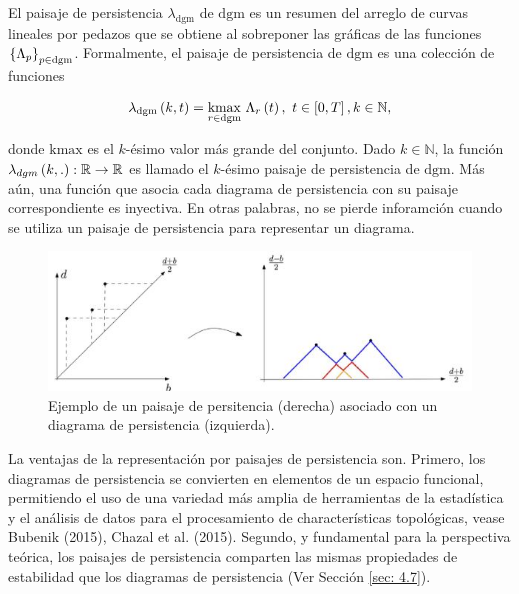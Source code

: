 El paisaje de persistencia $\lambda_{\mathrm{dgm}}$ de $\mathrm{dgm}$ es un resumen
del arreglo de curvas lineales por pedazos que se obtiene al sobreponer las gr\'aficas
de las funciones $\left\{\Lambda_{p}\right\}_{p\in\mathrm{dgm}}$.
Formalmente, el paisaje de persistencia de $\mathrm{dgm}$ es una colecci\'on de funciones

\begin{equation*}
    \lambda_{\mathrm{dgm}}\left(k,t\right) =
    \underset{r\in\mathrm{dgm}}{\mathrm{kmax}}\text{ }\Lambda_{r}\left(t\right),
    \text{  }t\in\left[0,T\right],k\in\mathbb{N},
\end{equation*}

\noindent donde $\mathrm{kmax}$ es el $k$-\'esimo valor m\'as grande del conjunto.
Dado $k\in\mathbb{N}$, la funci\'on $\lambda_{dgm}\left(k,.\right):\mathbb{R}\rightarrow\mathbb{R}$
es llamado el $k$-\'esimo paisaje de persistencia de $\mathrm{dgm}$.
M\'as a\'un, una funci\'on que asocia cada diagrama de persistencia con su paisaje correspondiente
es inyectiva.
En otras palabras, no se pierde inforamci\'on cuando se utiliza un paisaje de persistencia
para representar un diagrama.

\begin{figure}[ht]
    \centering
    \includegraphics[width=0.85\linewidth]{./figures/Figura12.JPG}
    \caption{
        Ejemplo de un paisaje de persitencia (derecha) asociado con un
        diagrama de persistencia (izquierda).
    }
    \label{fig:Figura 12}
    \vspace{15pt}
\end{figure}

La ventajas de la representaci\'on por paisajes de persistencia son.
Primero, los diagramas de persistencia se convierten en elementos de un espacio funcional,
permitiendo el uso de una variedad m\'as amplia de herramientas de la estad\'istica y
el an\'alisis de datos para el procesamiento de character\'isticas topol\'ogicas,
vease Bubenik (2015)\cite{Bubenik2015}, Chazal et al. (2015)\cite{Chazal2014b}.
Segundo, y fundamental para la perspectiva te\'orica,
los paisajes de persistencia comparten las mismas propiedades de estabilidad
que los diagramas de persistencia (Ver Secci\'on \ref{sec: 4.7}).

